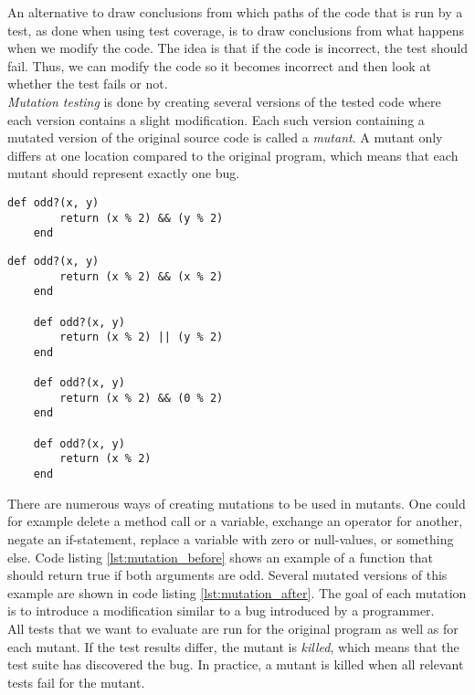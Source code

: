 An alternative to draw conclusions from which paths of the code that is
run by a test, as done when using test coverage, is to draw conclusions
from what happens when we modify the code. The idea is that if the code
is incorrect, the test should fail. Thus, we can modify the code so it
becomes incorrect and then look at whether the test fails or not.\\

\emph{Mutation testing} is done by creating several versions of the
tested code where each version contains a slight modification. Each such
version containing a mutated version of the original source code is
called a \emph{mutant}. A mutant only differs at one location compared
to the original program, which means that each mutant should represent
exactly one bug. \cite{article:mutation, wiki:mutation}\\

\begin{lstlisting}[caption=Example of a piece of code before mutation.,
                   label=lst:mutation_before, float=t]
    def odd?(x, y)
        return (x % 2) && (y % 2)
    end
\end{lstlisting}


\begin{lstlisting}[caption=Mutated versions of code listing \ref{lst:mutation_before}.,
                   label=lst:mutation_after, float=t]
    def odd?(x, y)
        return (x % 2) && (x % 2)
    end

    def odd?(x, y)
        return (x % 2) || (y % 2)
    end

    def odd?(x, y)
        return (x % 2) && (0 % 2)
    end

    def odd?(x, y)
        return (x % 2)
    end
\end{lstlisting}

There are numerous ways of creating mutations to be used in mutants. One
could for example delete a method call or a variable, exchange an
operator for another, negate an if-statement, replace a variable with
zero or null-values, or something else. Code listing
\ref{lst:mutation_before} shows an example of a function that should
return true if both arguments are odd. Several mutated versions of this
example are shown in code listing \ref{lst:mutation_after}. The goal of
each mutation is to introduce a modification similar to a bug introduced
by a programmer. \cite{article:mutation}\\

All tests that we want to evaluate are run for the original program as
well as for each mutant. If the test results differ, the mutant is
\emph{killed}, which means that the test suite has discovered the bug.
In practice, a mutant is killed when all relevant tests fail for the
mutant. \cite{wiki:mutation}\\

